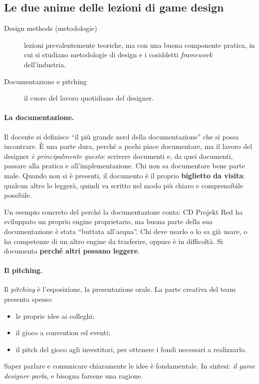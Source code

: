 \subsection{Le due anime delle lezioni di game design}

\begin{description}
  \item[Design methods (metodologie)] lezioni prevalentemente teoriche, ma con
        una buona componente pratica, in cui si studiano metodologie di design
        e i cosiddetti \emph{framework} dell'industria.
  \item[Documentazione e pitching] il cuore del lavoro quotidiano del
        designer.
\end{description}

\paragraph{La documentazione.}
Il docente si definisce ``il più grande nerd della documentazione'' che si
possa incontrare. È una parte dura, perché a pochi piace documentare, ma il
lavoro del designer \emph{è principalmente questo}: scrivere documenti e, da
quei documenti, passare alla pratica e all'implementazione. Chi non sa
documentare bene parte male. Quando non si è presenti, il documento è il
proprio \textbf{biglietto da visita}: qualcun altro lo leggerà, quindi va
scritto nel modo più chiaro e comprensibile possibile.

Un esempio concreto del perché la documentazione conta: CD Projekt Red ha
sviluppato un proprio engine proprietario, ma buona parte della sua
documentazione è stata ``buttata all'acqua''. Chi deve usarlo o lo sa già
usare, o ha competenze di un altro engine da trasferire, oppure è in
difficoltà. Si documenta \textbf{perché altri possano leggere}.

\paragraph{Il pitching.}
Il \emph{pitching} è l'esposizione, la presentazione orale. La parte creativa
del team presenta spesso:
\begin{itemize}
  \item le proprie idee ai colleghi;
  \item il gioco a convention ed eventi;
  \item il pitch del gioco agli investitori, per ottenere i fondi necessari a
        realizzarlo.
\end{itemize}
Saper parlare e comunicare chiaramente le idee è fondamentale. In sintesi:
\emph{il game designer parla}, e bisogna farsene una ragione.

